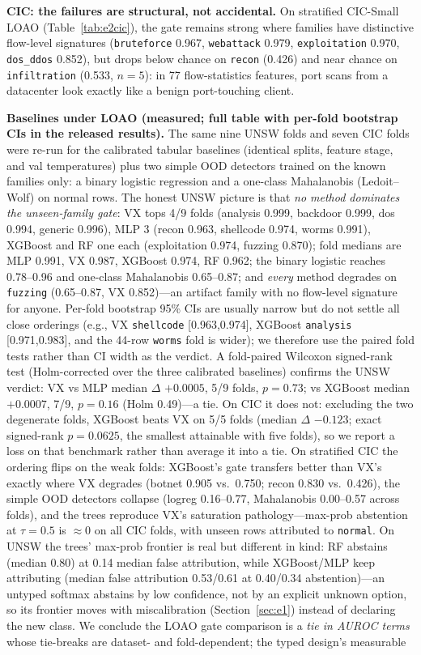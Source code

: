 \documentclass[sigconf,anonymous=false]{acmart}
\begin{document}
\textbf{CIC: the failures are structural, not accidental.} On stratified CIC-Small LOAO (Table~\ref{tab:e2cic}), the gate remains strong where families have distinctive flow-level signatures (\texttt{bruteforce} 0.967, \texttt{webattack} 0.979, \texttt{exploitation} 0.970, \texttt{dos\_ddos} 0.852), but drops below chance on \texttt{recon} (0.426) and near chance on \texttt{infiltration} (0.533, $n=5$): in 77 flow-statistics features, port scans from a datacenter look exactly like a benign port-touching client.

\textbf{Baselines under LOAO (measured; full table with per-fold bootstrap CIs in the released results).} The same nine UNSW folds and seven CIC folds were re-run for the calibrated tabular baselines (identical splits, feature stage, and val temperatures) plus two simple OOD detectors trained on the known families only: a binary logistic regression and a one-class Mahalanobis (Ledoit--Wolf) on normal rows. The honest UNSW picture is that \emph{no method dominates the unseen-family gate}: VX tops 4/9 folds (analysis 0.999, backdoor 0.999, dos 0.994, generic 0.996), MLP 3 (recon 0.963, shellcode 0.974, worms 0.991), XGBoost and RF one each (exploitation 0.974, fuzzing 0.870); fold medians are MLP 0.991, VX 0.987, XGBoost 0.974, RF 0.962; the binary logistic reaches 0.78--0.96 and one-class Mahalanobis 0.65--0.87; and \emph{every} method degrades on \texttt{fuzzing} (0.65--0.87, VX 0.852)---an artifact family with no flow-level signature for anyone. Per-fold bootstrap 95\% CIs are usually narrow but do not settle all close orderings (e.g., VX \texttt{shellcode} [0.963,0.974], XGBoost \texttt{analysis} [0.971,0.983], and the 44-row \texttt{worms} fold is wider); we therefore use the paired fold tests rather than CI width as the verdict. A fold-paired Wilcoxon signed-rank test (Holm-corrected over the three calibrated baselines) confirms the UNSW verdict: VX vs MLP median $\Delta$ $+0.0005$, 5/9 folds, $p{=}0.73$; vs XGBoost median $+0.0007$, 7/9, $p{=}0.16$ (Holm 0.49)---a tie. On CIC it does not: excluding the two degenerate folds, XGBoost beats VX on 5/5 folds (median $\Delta$ $-0.123$; exact signed-rank $p{=}0.0625$, the smallest attainable with five folds), so we report a loss on that benchmark rather than average it into a tie. On stratified CIC the ordering flips on the weak folds: XGBoost's gate transfers better than VX's exactly where VX degrades (botnet 0.905 vs.\ 0.750; recon 0.830 vs.\ 0.426), the simple OOD detectors collapse (logreg 0.16--0.77, Mahalanobis 0.00--0.57 across folds), and the trees reproduce VX's saturation pathology---max-prob abstention at $\tau{=}0.5$ is $\approx$0 on all CIC folds, with unseen rows attributed to \texttt{normal}. On UNSW the trees' max-prob frontier is real but different in kind: RF abstains (median 0.80) at 0.14 median false attribution, while XGBoost/MLP keep attributing (median false attribution 0.53/0.61 at 0.40/0.34 abstention)---an untyped softmax abstains by low confidence, not by an explicit unknown option, so its frontier moves with miscalibration (Section~\ref{sec:e1}) instead of declaring the new class. We conclude the LOAO gate comparison is a \emph{tie in AUROC terms} whose tie-breaks are dataset- and fold-dependent; the typed design's measurable 
\end{document}
